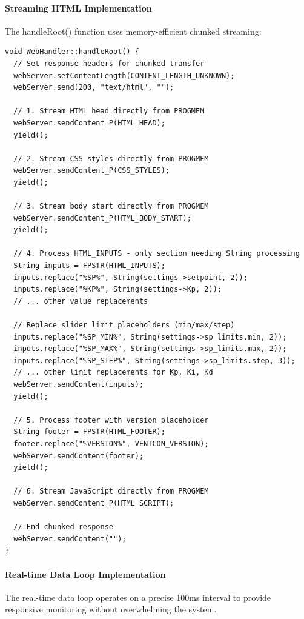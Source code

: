 \documentclass[12pt,a4paper]{article}
\begin{document}
\paragraph{Streaming HTML Implementation}
The handleRoot() function uses memory-efficient chunked streaming:

\begin{lstlisting}[caption=handleRoot() Streaming Implementation]
void WebHandler::handleRoot() {
  // Set response headers for chunked transfer
  webServer.setContentLength(CONTENT_LENGTH_UNKNOWN);
  webServer.send(200, "text/html", "");
  
  // 1. Stream HTML head directly from PROGMEM
  webServer.sendContent_P(HTML_HEAD);
  yield();
  
  // 2. Stream CSS styles directly from PROGMEM
  webServer.sendContent_P(CSS_STYLES);
  yield();
  
  // 3. Stream body start directly from PROGMEM  
  webServer.sendContent_P(HTML_BODY_START);
  yield();
  
  // 4. Process HTML_INPUTS - only section needing String processing
  String inputs = FPSTR(HTML_INPUTS);
  inputs.replace("%SP%", String(settings->setpoint, 2));
  inputs.replace("%KP%", String(settings->Kp, 2));
  // ... other value replacements
  
  // Replace slider limit placeholders (min/max/step)
  inputs.replace("%SP_MIN%", String(settings->sp_limits.min, 2));
  inputs.replace("%SP_MAX%", String(settings->sp_limits.max, 2));
  inputs.replace("%SP_STEP%", String(settings->sp_limits.step, 3));
  // ... other limit replacements for Kp, Ki, Kd
  webServer.sendContent(inputs);
  yield();
  
  // 5. Process footer with version placeholder
  String footer = FPSTR(HTML_FOOTER);
  footer.replace("%VERSION%", VENTCON_VERSION);
  webServer.sendContent(footer);
  yield();
  
  // 6. Stream JavaScript directly from PROGMEM
  webServer.sendContent_P(HTML_SCRIPT);
  
  // End chunked response
  webServer.sendContent("");
}
\end{lstlisting}

\paragraph{Real-time Data Loop Implementation}
The real-time data loop operates on a precise 100ms interval to provide responsive monitoring without overwhelming the system.
\end{document}
